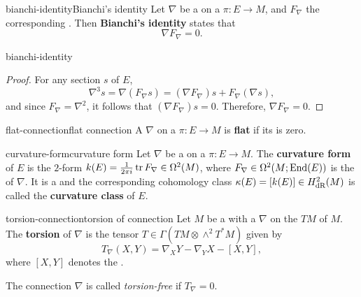 \begin{topic}{bianchi-identity}{Bianchi's identity}
    Let $\nabla$ be a  on a  $\pi \colon E \to M$, and $F_\nabla$ the corresponding . Then \textbf{Bianchi's identity} states that
    \[ \nabla F_\nabla = 0 . \]
\end{topic}

\begin{example}{bianchi-identity}
    \begin{proof}
        For any section $s$ of $E$,
        \[ \nabla^3 s = \nabla (F_\nabla s) = (\nabla F_\nabla) s + F_\nabla (\nabla s) , \]
        and since $F_\nabla = \nabla^2$, it follows that $(\nabla F_\nabla) s = 0$. Therefore, $\nabla F_\nabla = 0$.
    \end{proof}
\end{example}

\begin{topic}{flat-connection}{flat connection}
    A  $\nabla$ on a  $\pi \colon E \to M$ is \textbf{flat} if its  is zero.
\end{topic}

\begin{topic}{curvature-form}{curvature form}
    Let $\nabla$ be a  on a  $\pi \colon E \to M$. The \textbf{curvature form} of $E$ is the $2$-form $k(E) = \frac{1}{2 \pi i} \operatorname{tr} F_\nabla \in \Omega^2(M)$, where $F_\nabla \in \Omega^2(M; \textup{End}(E))$ is the  of $\nabla$. It is a  and the corresponding cohomology class $\kappa(E) = [k(E)] \in H_\textup{dR}^2(M)$ is called the \textbf{curvature class} of $E$.
\end{topic}

\begin{topic}{torsion-connection}{torsion of connection}
    Let $M$ be a  with a  $\nabla$ on the  $TM$ of $M$. The \textbf{torsion} of $\nabla$ is the tensor $T \in \Gamma(TM \otimes \wedge^2 T^* M)$ given by
    \[ T_\nabla(X, Y) = \nabla_X Y  - \nabla_Y X - [X, Y] , \]
    where $[X, Y]$ denotes the .
    
    The connection $\nabla$ is called \textit{torsion-free} if $T_\nabla = 0$.
\end{topic}

